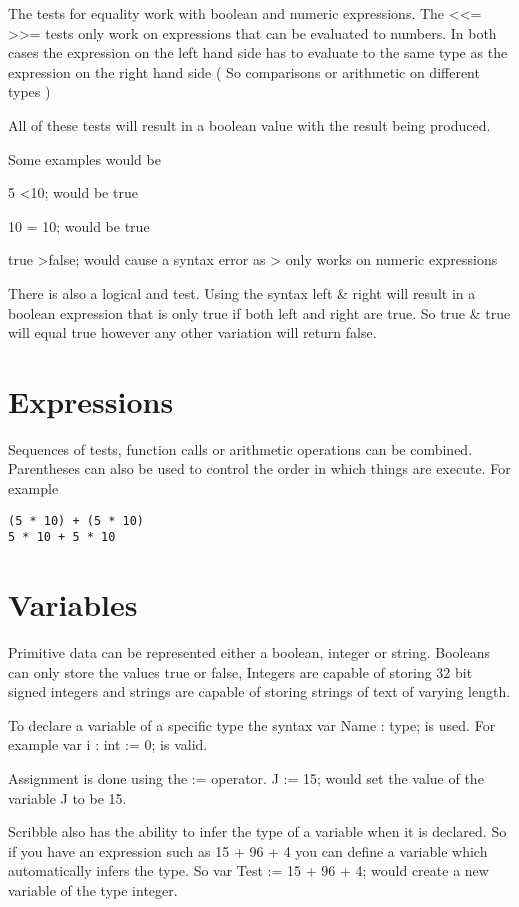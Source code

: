 \documentclass[]{final_report}
\begin{document}
The tests for equality work with boolean and numeric expressions. The \textless \textless= \textgreater \textgreater= tests only work on expressions that can be evaluated to numbers. In both cases the expression on the left hand side has to evaluate to the same type as the expression on the right hand side ( So comparisons or arithmetic on different types  )

All of these tests will result in a boolean value with the result being produced.

Some examples would be

5 \textless 10; would be true

10 = 10; would be true

true \textgreater false; would cause a syntax error as > only works on numeric expressions

There is also a logical and test. Using the syntax left \& right will result in a boolean expression that is only true if both left and right are true. So true \& true will equal true however any other variation will return false. 

\section{Expressions}

Sequences of tests, function calls or arithmetic operations can be combined. Parentheses can also be used to control the order in which things are execute. For example

\begin{verbatim}
(5 * 10) + (5 * 10)
5 * 10 + 5 * 10
\end{verbatim}

\section{Variables}

Primitive data can be represented either a boolean, integer or string. Booleans can only store the values true or false, Integers are capable of storing 32 bit signed integers and strings are capable of storing strings of text of varying length.

To declare a variable of a specific type the syntax var Name : type; is used. For example var i : int := 0; is valid.

Assignment is done using the := operator. J := 15; would set the value of the variable J to be 15.

Scribble also has the ability to infer the type of a variable when it is declared. So if you have an expression such as 15 + 96 + 4 you can define a variable which automatically infers the type. So var Test := 15 + 96 + 4; would create a new variable of the type integer.
\end{document}
